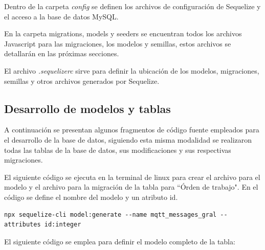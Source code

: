 Dentro de la carpeta \textit{config} se definen los archivos de configuración de Sequelize y el acceso a la base de datos MySQL.

En la carpeta migrations, models y seeders se encuentran todos los archivos Javascript para las migraciones, los modelos y semillas, estos archivos se detallarán en las próximas secciones. 

El archivo \textit{.sequelizerc} sirve para definir la ubicación de los modelos, migraciones, semillas y otros archivos generados por Sequelize.


\subsection{Desarrollo de modelos y tablas}
\label{subsec:modelobasededatos}



A continuación se presentan algunos fragmentos de código fuente empleados para el desarrollo de la base de datos, siguiendo esta misma modalidad se realizaron todas las tablas de la base de datos, sus modificaciones y sus respectivas migraciones.


El siguiente código se ejecuta en la terminal de linux para crear el archivo para el modelo y el archivo para la migración de la tabla para ``Órden de trabajo". En el código se define el nombre del modelo y un atributo id. 

\begin{lstlisting}[label=cod:sequelizeclimodel,caption=Código CLI para crear modelo y migración en Sequelize.]
npx sequelize-cli model:generate --name mqtt_messages_gral --attributes id:integer
\end{lstlisting}

El siguiente código se emplea para definir el modelo completo de la tabla:

